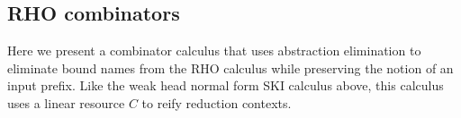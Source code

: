 \documentclass[a4paper,UKenglish]{lipics-v2016}
\begin{document}
\begin{center}
 \DP
\end{center}

\begin{center}
  
 \DP
\end{center}
\subsection{RHO combinators}
  Here we present a combinator calculus that uses abstraction elimination to eliminate bound names from the RHO calculus while preserving the notion of an input prefix.  Like the weak head normal form SKI calculus above, this calculus uses a linear resource $C$ to reify reduction contexts.
\end{document}
